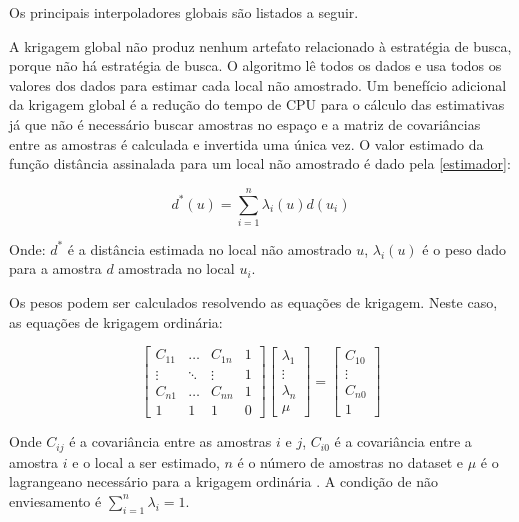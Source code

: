 Os principais interpoladores globais são listados a seguir.


A krigagem global \cite{neufeldglobalkriging} não produz nenhum artefato relacionado à estratégia de busca, porque não há estratégia de busca. O algoritmo lê todos os dados e usa todos os valores dos dados para estimar cada local não amostrado. Um benefício adicional da krigagem global é a redução do tempo de CPU para o cálculo das estimativas já que não é necessário buscar amostras no espaço e a matriz de covariâncias entre as amostras é calculada e invertida uma única vez. O valor estimado da função distância assinalada para um local não amostrado é dado pela \autoref{estimador}:

\begin{equation}
\label{estimador}
d^*(u)=\sum_{i=1}^{n} \lambda_i(u) d(u_i)
\end{equation}

Onde: $d^*$ é a distância estimada no local não amostrado $u$, $\lambda_i(u)$ é o peso dado para a amostra $d$ amostrada no local $u_i$.

Os pesos podem ser calculados resolvendo as equações de krigagem. Neste caso, as equações de krigagem ordinária:

\begin{equation}
    \label{global_k}
    \begin{bmatrix} 
    C_{11}&\dots&C_{1n}&1\\
    \vdots&\ddots&\vdots&1\\
    C_{n1}&\dots&C_{nn}&1\\ 
    1&1&1&0
    \end{bmatrix}
    \begin{bmatrix} 
    \lambda_{1}\\
    \vdots\\
    \lambda_{n}\\ 
    \mu
    \end{bmatrix}
    =
    \begin{bmatrix} 
    C_{10}\\
    \vdots\\
    C_{n0}\\ 
    1
    \end{bmatrix}
\end{equation}

Onde $C_{ij}$ é a covariância entre as amostras $i$ e $j$, $C_{i0}$ é a covariância entre a amostra $i$ e o local a ser estimado, $n$ é o número de amostras no dataset e $\mu$ é o lagrangeano necessário para a krigagem ordinária \cite{isaaks1989applied}. A condição de não enviesamento é $\sum_{i=1}^{n} \lambda_i=1$.

